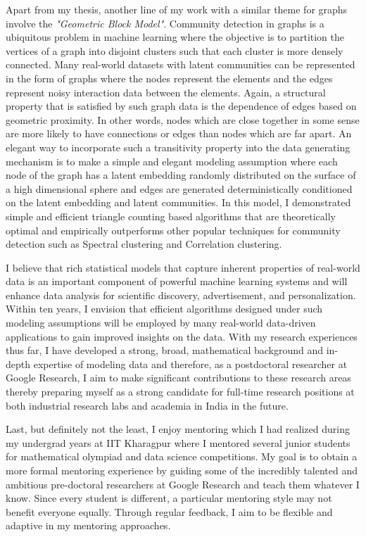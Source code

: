 \documentclass[paper=a4, fontsize=12pt]{article}
\begin{document}
Apart from my thesis, another line of my work with a similar theme for graphs involve the \textit{"Geometric Block Model"}. Community detection in graphs is a ubiquitous problem in machine learning where the objective is to partition the vertices of a graph into disjoint clusters such that each cluster is more densely connected. Many real-world datasets with latent communities can be represented in the form of graphs where the nodes represent the elements and the edges represent noisy interaction data between the elements. Again, a structural property that is satisfied by such graph data is the dependence of edges based on geometric proximity. In other words, nodes which are close together in some sense are more likely to have connections or edges than nodes which are far apart. An elegant way to incorporate such a transitivity property into the data generating mechanism is to make a simple and elegant modeling assumption where each node of the graph has a latent embedding randomly distributed on the surface of a high dimensional sphere and edges are generated deterministically conditioned on the latent embedding and latent communities.
In this model, I demonstrated simple and efficient triangle counting based algorithms \cite{galhotra2017geometric,GalhotraMPS19} that are theoretically optimal and empirically outperforms other popular techniques for community detection such as Spectral clustering and Correlation clustering. 

I believe that rich statistical models that capture inherent properties of real-world data is an important component of powerful machine learning systems and will enhance data analysis for scientific discovery, advertisement, and personalization. Within ten years, I envision that efficient algorithms designed under such modeling assumptions will be employed by many real-world data-driven applications to gain improved insights on the data. 
With my research experiences thus far, I have developed a strong, broad, mathematical background and in-depth expertise of modeling data and therefore, as a postdoctoral researcher at Google Research, I aim to make significant contributions to these research areas thereby preparing myself as a strong candidate for full-time research positions at both industrial research labs and academia in India in the future.

Last, but definitely not the least, I enjoy mentoring which I had realized during my undergrad years at IIT Kharagpur where I mentored several junior students for mathematical olympiad and data science competitions. My goal is to obtain a more formal mentoring experience by guiding some of the incredibly talented and ambitious pre-doctoral researchers at Google Research and teach them whatever I know. Since every student is different, a particular mentoring style may not benefit everyone equally. Through regular feedback, I aim to be flexible and adaptive in my mentoring approaches.





 
\end{document}
